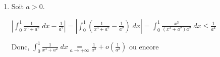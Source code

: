 {{\begin{enumerate}
\begin{center}
\end{center}

\item  Soit $a>0$.

\begin{center}
$\left|\int_{0}^{1}\frac{1}{x^3+a^2}\;dx -\frac{1}{a^2}\right| =\left|\int_{0}^{1}\left(\frac{1}{x^3+a^2}-\frac{1}{a^2}\right)\;dx\right| =\int_{0}^{1}\frac{x^3}{(x^3+a^2)a^2}\;dx\leqslant\frac{1}{a^4}$
\end{center}

Donc, $\int_{0}^{1}\frac{1}{x^3+a^2}\;dx\underset{a\rightarrow+\infty}{=}\frac{1}{a^2}+o\left(\frac{1}{a^2}\right)$ ou encore

\begin{center}
\end{center}
\end{enumerate}}
}